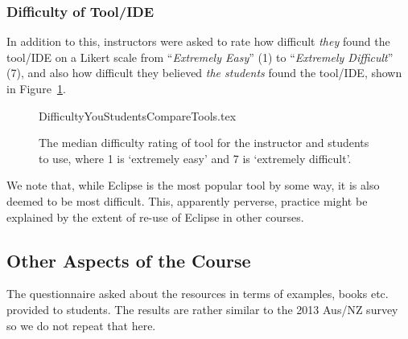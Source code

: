 \documentclass{sig-alternate}
\begin{document}
\subsubsection{Difficulty of Tool/IDE}

In addition to this, instructors were asked to rate how difficult
{\emph{they}} found the tool/IDE on a Likert scale from
``{\emph{Extremely Easy}}'' (1) to ``{\emph{Extremely Difficult}}''
(7), and also how difficult they believed {\emph{the students}} found
the tool/IDE, shown in Figure~\ref{fig:toolhard}.

\begin{figure}
\begin{center}
{DifficultyYouStudentsCompareTools.tex}
\end{center}\vskip-18pt
\caption{The median difficulty rating of tool for the instructor and students to use, where 1 is `extremely easy' and 7 is `extremely difficult'.  %
\label{fig:toolhard}}
\end{figure}

We note that, while Eclipse is the most popular tool by some way, it
is also deemed to be most difficult. This, apparently perverse,
practice might be explained by the extent of re-use of Eclipse in
other courses.



\subsection{Other Aspects of the Course}
\iffalse
\subsubsection{External Delivery}
\begin{figure}
\begin{center}
{Steps.tex}
\end{center}\vskip-18pt
\caption{Steps taken to determine whether students have received unauthorised assistance on assignments.\label{fig:Plagiarise}}
\end{figure}
\subsubsection{Resources provided to students}
\fi
The questionnaire asked about the resources in terms of examples,
books etc. provided to students. The results are rather similar to the
2013 Aus/NZ survey~\cite[Figure 14]{mason+cooper:2014} so we do not
repeat that here.
\end{document}
